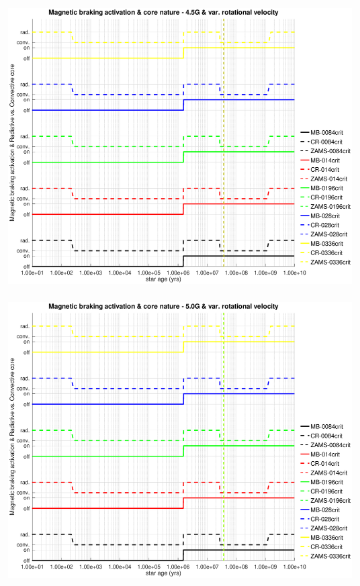 \documentclass[fleqn,usenatbib]{mnras}
\begin{document}
\begin{figure}
\begin{subfigure}[h]{0.47\textwidth}
    \includegraphics[trim = 30mm 15mm 20mm 15mm, clip,width=\textwidth]{figures/mb_act_var_vel_4_5g.eps}
    \label{fig:subim33}
    \end{subfigure}
    \begin{subfigure}[h]{0.47\textwidth}
    \includegraphics[trim = 30mm 15mm 20mm 15mm, clip,width=\textwidth]{figures/mb_act_var_vel_5_0g.eps}
    \label{fig:subim34}
    \end{subfigure}
    \begin{subfigure}[h]{0.47\textwidth}

\end{subfigure}
\end{figure}
\end{document}

